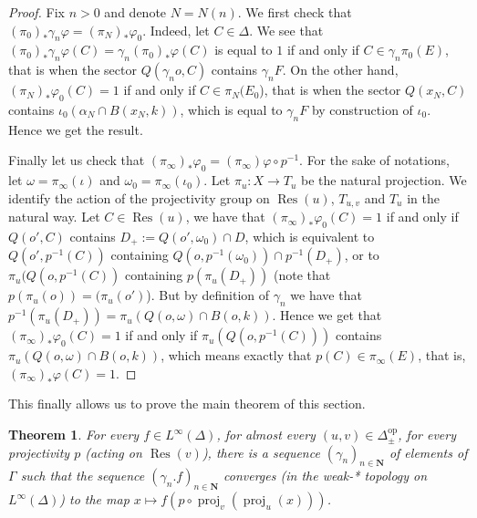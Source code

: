 \documentclass[a4paper, 11pt]{article}
\theoremstyle{plain}
\newtheorem{theorem}[proposition]{Theorem}
\theoremstyle{definition}
\theoremstyle{remark}
\DeclareMathOperator{\proj}{proj}
\DeclareMathOperator{\Res}{Res}
\newcommand{\NN}{\mathbf{N}}                          %
\newcommand{\op}{\mathrm{op}}
\begin{document}
\begin{proof}
    Fix $n>0$ and denote $N=N(n)$. We first check that $(\pi_0)_*\gamma_n\varphi=(\pi_{N})_*\varphi_0$. Indeed, let $C\in \Delta$. We see that $(\pi_0)_*\gamma_n\varphi(C)=\gamma_n(\pi_0)_*\varphi(C)$ is equal to $1$ if and only if $C\in \gamma_n \pi_0(E)$, that is when the sector $Q(\gamma_n o,C)$ contains $\gamma_n F$. On the other hand, $(\pi_{N})_*\varphi_0(C)=1$ if and only if $C\in \pi_N(E_0$), that is when the sector $Q(x_N,C)$ contains $\iota_0(\alpha_N\cap B(x_N,k))$, which is equal to $\gamma_n F$ by construction of $\iota_0$. Hence we get the result.

    Finally let us check that $(\pi_\infty)_*\varphi_0=(\pi_\infty)\varphi\circ p^{-1}$. For the sake of notations, let $\omega=\pi_\infty(\iota)$ and $\omega_0=\pi_\infty(\iota_0)$. Let $\pi_u:X\to T_u$ be the natural projection. We identify the action of the projectivity group on $\Res(u)$, $T_{u,v}$ and $T_u$ in the natural way. Let $C\in\Res(u)$, we have that 
    $(\pi_{\infty})_*\varphi_0(C)=1$ if and only if $Q(o',C)$ contains $D_+:=Q(o',\omega_0)\cap D$, which is equivalent to $Q(o',p^{-1}(C))$ containing $Q(o,p^{-1}(\omega_0))\cap p^{-1}(D_+)$, or to $\pi_u(Q(o,p^{-1}(C))$ containing $p(\pi_u(D_+))$ (note that $p(\pi_u(o))=(\pi_u(o')$). But by definition of $\gamma_n$ we have that $p^{-1}(\pi_u(D_+)) = \pi_u(Q(o,\omega)\cap B(o,k))$. Hence we get that $(\pi_{\infty})_*\varphi_0(C)=1$ if and only if  $\pi_u(Q(o,p^{-1}(C)))$ contains $\pi_u(Q(o,\omega)\cap B(o,k))$, which means exactly that $p(C)\in \pi_\infty(E)$, that is, $(\pi_\infty)_*\varphi(C)=1$.
    
    


    
\end{proof}

This finally allows us to prove the main theorem of this section.

\begin{theorem}\label{thm:convTuvproj}
For every $f\in L^\infty(\Delta)$, for almost every $(u,v)\in \Delta_\pm^\op$, for every projectivity $p$ (acting on $\Res(v)$), 
there is a sequence $(\gamma_n)_{n\in\NN}$ of elements of $\Gamma$ such that the sequence $(\gamma_n.f)_{n\in \NN}$ converges (in the weak-* topology on $L^\infty(\Delta)$) to the  map $x\mapsto  f(p\circ \proj_v(\proj_u(x)))$.
\end{theorem}
\end{document}
